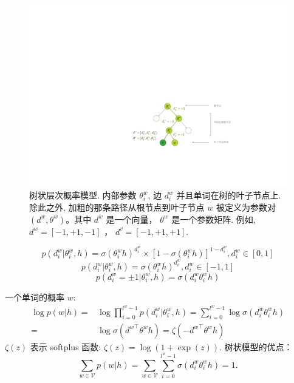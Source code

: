\documentclass[master,openright,twoside,color]{buaathesis}
\begin{document}
\begin{figure}
  \centering
    \includegraphics[width=0.7\linewidth]{./figures/thsm.pdf}
\caption{树状层次概率模型. 内部参数 $\theta_i^w$, 边 $d_i^w$ 并且单词在树的叶子节点上. 除此之外, 加粗的那条路径从根节点到叶子节点 $w$ 被定义为参数对 $(d^w,\theta^w)$。其中 $d^w$ 是一个向量， $\theta^w$ 是一个参数矩阵. 例如, $d^w=[-1,+1,-1]$ ， $d^{v}=[-1,+1,+1]$.}\label{fig:tree_hsm} %
\end{figure}

 \begin{equation}
p(d^w_i|\theta_{i}^w,h) =\sigma(\theta_{i}^w h)^{d_i^w}\times[1-\sigma(\theta_{i}^w h)]^{1-{d_i^w}},d_i^w \in [0,1]
\end{equation}
 \begin{equation}
p(d^w_i|\theta_{i}^w,h) =\sigma(\theta_{i}^w h)^{d_i^w}, d_i^w \in [-1,1]
\end{equation}
\begin{equation}
p(d^w_i=\pm 1|\theta_{i}^w,h) = \sigma({d_i^w}\theta_{i}^w h)
\end{equation}

一个单词的概率 $w$:
\begin{equation}\label{equ:pw}
\begin{split}
 \log p(w|h)=&\log\prod_{i=0}^{l^w-1} p(d^w_i|\theta_{i}^w,h) = \sum_{i=0}^{l^w -1} \log\sigma(d_i^w \theta_{i}^w h)\\
 =&\log\sigma({d^w}^\top \theta^w h)=\zeta(- {d^w}^\top \theta^w h )
 \end{split}
\end{equation}
$\zeta(z)$ 表示 softplus 函数: $\zeta(z)= \log (1+\exp(z))$.
树状模型的优点：
\begin{equation}
\sum_{w\in \mathcal{V}}{p(w|h)}=\sum_{w \in \mathcal{V}}\sum_{i=0}^{l^w-1}{\sigma(d_i^w\theta_{i}^w h)}=1.
\end{equation}
\end{document}
